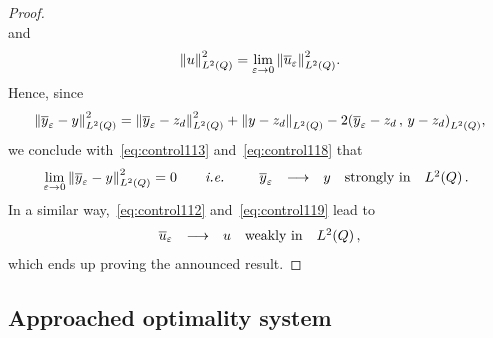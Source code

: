 \begin{proof}
\begin{equation}
    \end{equation}
    and
    \begin{equation}\label{eq:control119}
        {\left\|{u }\right\|}_{L^{2}\left({Q}\right)}^{2} = \lim_{\varepsilon\to 0}{\left\|{{\overline{u}}_{\varepsilon} }\right\|}_{L^{2}\left({Q}\right)}^{2}.
    \end{equation}
    Hence, since
    \begin{equation*}
        \normecq{\bareps{y} - y} = \normecq{\bareps{y} - z_{d}} + \normeq{y
        - z_{d}} -2\scalaireq{%
            \bareps{y} - z_{d}
        }{%
            y - z_{d}
        },
    \end{equation*}
    we conclude with~\eqref{eq:control113} and~\eqref{eq:control118} that
    \begin{equation*}\label{eq:control120}
        \lim_{\varepsilon\to 0}{\left\|{{\overline{y}}_{\varepsilon} - y }\right\|}_{L^{2}\left({Q}\right)}^{2} = 0\qquad\textit{i.e.}\qquad
        \begin{array}{rclll}
            {\overline{y}}_{\varepsilon} & \longrightarrow & y & \text{strongly in} &
            L^{2}\!\left({Q}\right).
        \end{array}
    \end{equation*}
    In a similar way,~\eqref{eq:control112} and~\eqref{eq:control119} lead
    to
    \begin{equation*}
        \begin{array}{rclll}
            {\overline{u}}_{\varepsilon} & \longrightarrow & u & \text{weakly in} & L^{2}\!\left({Q}\right),
        \end{array}
    \end{equation*}
    which ends up proving the announced result.
\end{proof}

\subsection{Approached optimality system}\label{sec:approachedso}

